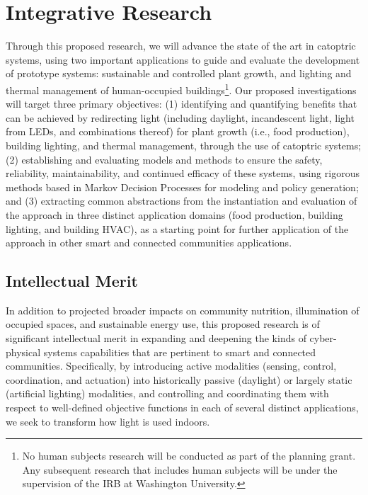 \section{Integrative Research}
\label{sec:research}


Through this proposed research, we will advance the state of the art in
catoptric systems, using two important applications to guide and evaluate the
development of prototype systems: sustainable and controlled plant growth,
and lighting
and thermal management of human-occupied buildings\footnote{No human subjects
research will be conducted as part of the planning grant. Any subsequent
research
that includes human subjects will be under the supervision of the IRB at
Washington University.}.
Our proposed investigations
will target three primary objectives: (1) identifying and quantifying benefits
that can be achieved by redirecting light (including daylight, incandescent
light, light from LEDs, and combinations thereof) for 
plant growth (i.e., food production),
building lighting, and thermal management, through the use of
catoptric systems; (2) establishing and evaluating models and methods to ensure
the safety, reliability, maintainability, and continued efficacy of these
systems, using rigorous methods based in Markov Decision Processes for modeling
and policy generation; and (3) extracting common abstractions from the
instantiation and evaluation of the approach in three distinct application
domains (food production, building lighting, and building HVAC), as a starting
point for further application of the approach in other smart and connected
communities applications.

\subsection{Intellectual Merit}
\label{sec:im}

In addition to projected broader impacts on community nutrition, illumination
of occupied spaces, and sustainable energy use, this proposed research is of
significant intellectual merit in expanding and deepening the kinds of
cyber-physical systems capabilities that are pertinent to smart and connected
communities. Specifically, by introducing active modalities (sensing, control,
coordination, and actuation) into historically passive (daylight) or largely
static (artificial lighting) modalities, and controlling and coordinating them
with respect to well-defined objective functions in each of several distinct
applications, we seek to transform how light is used indoors.  

